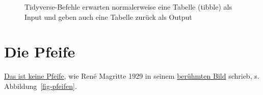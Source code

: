 \documentclass[
  letterpaper,
]{scrbook}
\theoremstyle{definition}
\theoremstyle{definition}
\theoremstyle{definition}
\theoremstyle{remark}
\begin{document}
\begin{figure}


\caption{\label{fig-tbl-in-out}Tidyverse-Befehle erwarten normalerweise
eine Tabelle (tibble) als Input und geben auch eine Tabelle zurück als
Output}

\end{figure}%

\section{Die Pfeife}\label{sec-pipe}

\href{https://en.wikipedia.org/wiki/The_Treachery_of_Images}{Das ist
keine Pfeife}, wie René Magritte 1929 in seinem
\href{https://en.wikipedia.org/wiki/File:MagrittePipe.jpg}{berühmten
Bild} schrieb, s. Abbildung~\ref{fig-pfeifen}.
\end{document}
